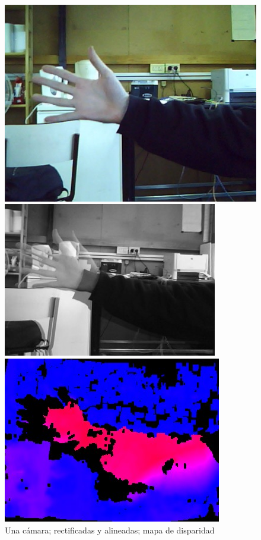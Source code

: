 \documentclass[journal,a4paper]{IEEEtran}
\begin{document}
\begin{figure}[h!]
    \centering
    \includegraphics[width=0.9\linewidth]{libelas1.jpg}
    
    \medskip
    
    \includegraphics[width=0.9\linewidth]{libelas2.jpg}
    
    \medskip
    
    \includegraphics[width=0.9\linewidth]{libelas3.jpg}
    \caption{Una cámara; rectificadas y alineadas; mapa de disparidad}
    \label{fig_libelas}
\end{figure}
\end{document}
